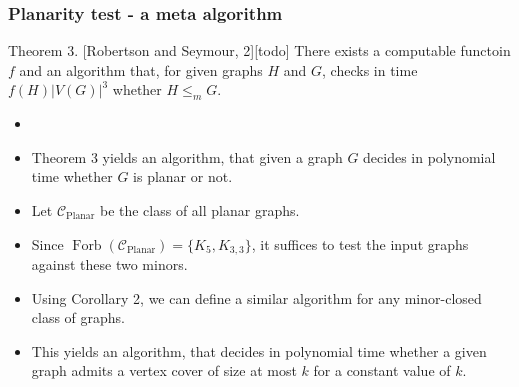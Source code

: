 \documentclass[t,usenames,dvipsnames]{beamer}
\newcommand{\cplanar}{\mathcal{C}_{\operatorname{Planar}}}
\begin{document}
\begin{frame} \frametitle{Planarity test - a meta algorithm}
	\begin{block}{Theorem 3. [Robertson and Seymour, 2][todo]}
			There exists a computable functoin $f$ and an algorithm that, for given
			graphs $H$ and $G$, checks in time $f(H)|V(G)|^3$ whether $H \leq_m G$.
	\end{block}
	\begin{itemize}[<+->]
		\item []
		\item Theorem 3 yields an algorithm, that given a graph $G$ decides in polynomial
			time whether $G$ is planar or not.
		\item Let $\cplanar$ be the class of all planar graphs.
		\item Since $\operatorname{Forb}(\cplanar) = \{K_5, K_{3,3}\}$, it suffices to test
			the input graphs against these two minors.
		\item Using Corollary 2, we can define a similar algorithm for any minor-closed
			class of graphs.
		\item This yields an algorithm, that decides in polynomial time whether a given
			graph admits a vertex cover of size at most $k$ for a constant value of
			$k$.
	\end{itemize}
\end{frame}
\end{document}
